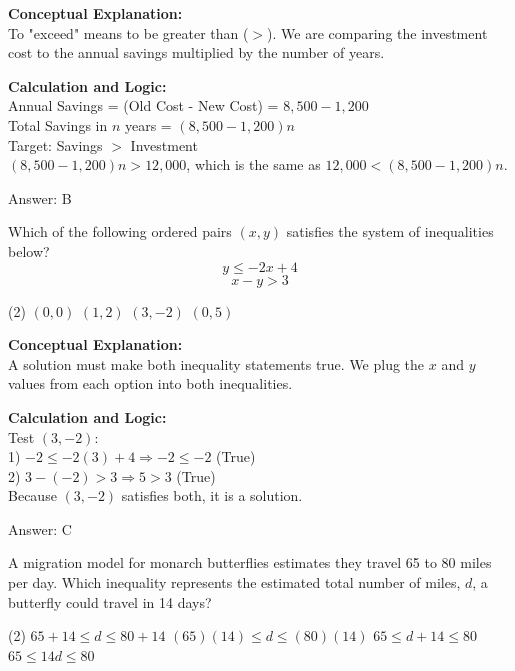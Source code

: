 \documentclass[11pt,paper=a4,answers]{exam}
\begin{document}
\begin{questions}
\begin{solution}
\textbf{Conceptual Explanation:} \\
To "exceed" means to be greater than ($>$). We are comparing the investment cost to the annual savings multiplied by the number of years.

\vspace{10pt}
\textbf{Calculation and Logic:} \\
Annual Savings = (Old Cost - New Cost) = $8,500 - 1,200$ \\
Total Savings in $n$ years = $(8,500 - 1,200)n$ \\
Target: Savings $>$ Investment \\
$(8,500 - 1,200)n > 12,000$, which is the same as $12,000 < (8,500 - 1,200)n$.

\vspace{15pt}
Answer: \colorbox{yellow!100}{B}
\end{solution}

\question
Which of the following ordered pairs $(x, y)$ satisfies the system of inequalities below?
\[ y \le -2x + 4 \]
\[ x - y > 3 \]
\begin{tasks}(2)
    \task $(0, 0)$
    \task $(1, 2)$
    \task $(3, -2)$
    \task $(0, 5)$
\end{tasks}

\begin{solution}
\textbf{Conceptual Explanation:} \\
A solution must make both inequality statements true. We plug the $x$ and $y$ values from each option into both inequalities.

\vspace{10pt}
\textbf{Calculation and Logic:} \\
Test $(3, -2)$: \\
1) $-2 \le -2(3) + 4 \Rightarrow -2 \le -2$ (True) \\
2) $3 - (-2) > 3 \Rightarrow 5 > 3$ (True) \\
Because $(3, -2)$ satisfies both, it is a solution.

\vspace{15pt}
Answer: \colorbox{yellow!100}{C}
\end{solution}

\question
A migration model for monarch butterflies estimates they travel 65 to 80 miles per day. Which inequality represents the estimated total number of miles, $d$, a butterfly could travel in 14 days?
\begin{tasks}(2)
    \task $65 + 14 \le d \le 80 + 14$
    \task $(65)(14) \le d \le (80)(14)$
    \task $65 \le d + 14 \le 80$
    \task $65 \le 14d \le 80$
\end{tasks}


\end{questions}
\end{document}
